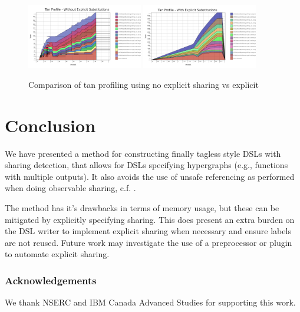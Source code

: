 \documentclass[runningheads]{llncs}
\begin{document}
\begin{figure}[!h]
  \centering
  \includegraphics[width=0.45\textwidth]{figs/noexplicit.png}
  \hfill
  \includegraphics[width=0.45\textwidth]{figs/explicit.png}
  \caption{Comparison of tan profiling using no explicit sharing vs explicit}
  \label{fig:explicitvsno}
\end{figure}

\section{Conclusion}
We have presented a method for constructing finally tagless style DSLs with
sharing detection, that allows for DSLs specifying hypergraphs (e.g., functions
with multiple outputs). It also avoids the use of unsafe referencing as
performed when doing observable sharing, c.f. \cite{gill:observablesharing}.

The method has it's drawbacks in terms of memory usage, but these can be
mitigated by explicitly specifying sharing. This does present an extra burden on
the DSL writer to implement explicit sharing when necessary and ensure labels
are not reused. Future work may investigate the use of a preprocessor or plugin
to automate explicit sharing.

\subsubsection{Acknowledgements} We thank NSERC and IBM Canada Advanced Studies for supporting this work.
%
%


\end{document}
